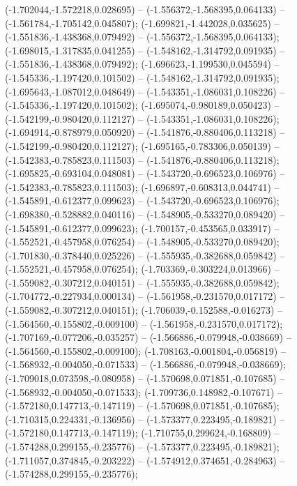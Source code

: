  (-1.702044,-1.572218,0.028695) -- (-1.556372,-1.568395,0.064133) -- (-1.561784,-1.705142,0.045807);
 (-1.699821,-1.442028,0.035625) -- (-1.551836,-1.438368,0.079492) -- (-1.556372,-1.568395,0.064133);
 (-1.698015,-1.317835,0.041255) -- (-1.548162,-1.314792,0.091935) -- (-1.551836,-1.438368,0.079492);
 (-1.696623,-1.199530,0.045594) -- (-1.545336,-1.197420,0.101502) -- (-1.548162,-1.314792,0.091935);
 (-1.695643,-1.087012,0.048649) -- (-1.543351,-1.086031,0.108226) -- (-1.545336,-1.197420,0.101502);
 (-1.695074,-0.980189,0.050423) -- (-1.542199,-0.980420,0.112127) -- (-1.543351,-1.086031,0.108226);
 (-1.694914,-0.878979,0.050920) -- (-1.541876,-0.880406,0.113218) -- (-1.542199,-0.980420,0.112127);
 (-1.695165,-0.783306,0.050139) -- (-1.542383,-0.785823,0.111503) -- (-1.541876,-0.880406,0.113218);
 (-1.695825,-0.693104,0.048081) -- (-1.543720,-0.696523,0.106976) -- (-1.542383,-0.785823,0.111503);
 (-1.696897,-0.608313,0.044741) -- (-1.545891,-0.612377,0.099623) -- (-1.543720,-0.696523,0.106976);
 (-1.698380,-0.528882,0.040116) -- (-1.548905,-0.533270,0.089420) -- (-1.545891,-0.612377,0.099623);
 (-1.700157,-0.453565,0.033917) -- (-1.552521,-0.457958,0.076254) -- (-1.548905,-0.533270,0.089420);
 (-1.701830,-0.378440,0.025226) -- (-1.555935,-0.382688,0.059842) -- (-1.552521,-0.457958,0.076254);
 (-1.703369,-0.303224,0.013966) -- (-1.559082,-0.307212,0.040151) -- (-1.555935,-0.382688,0.059842);
 (-1.704772,-0.227934,0.000134) -- (-1.561958,-0.231570,0.017172) -- (-1.559082,-0.307212,0.040151);
 (-1.706039,-0.152588,-0.016273) -- (-1.564560,-0.155802,-0.009100) -- (-1.561958,-0.231570,0.017172);
 (-1.707169,-0.077206,-0.035257) -- (-1.566886,-0.079948,-0.038669) -- (-1.564560,-0.155802,-0.009100);
 (-1.708163,-0.001804,-0.056819) -- (-1.568932,-0.004050,-0.071533) -- (-1.566886,-0.079948,-0.038669);
 (-1.709018,0.073598,-0.080958) -- (-1.570698,0.071851,-0.107685) -- (-1.568932,-0.004050,-0.071533);
 (-1.709736,0.148982,-0.107671) -- (-1.572180,0.147713,-0.147119) -- (-1.570698,0.071851,-0.107685);
 (-1.710315,0.224331,-0.136956) -- (-1.573377,0.223495,-0.189821) -- (-1.572180,0.147713,-0.147119);
 (-1.710755,0.299624,-0.168809) -- (-1.574288,0.299155,-0.235776) -- (-1.573377,0.223495,-0.189821);
 (-1.711057,0.374845,-0.203222) -- (-1.574912,0.374651,-0.284963) -- (-1.574288,0.299155,-0.235776);
